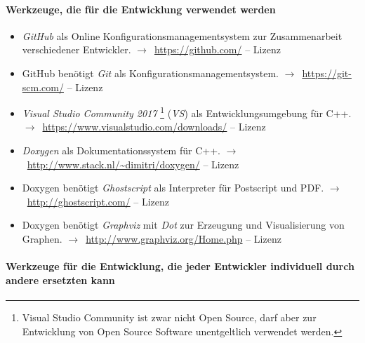 \documentclass[english,ngerman,parskip=half,headsepline,footsepline,
	fleqn,notitlepage]{scrreprt}
\newcounter{Enumi}%
\newcommand*{\tourl}[1]{$\rightarrow$~\url{#1}}
\begin{document}
	\paragraph{Werkzeuge, die für die Entwicklung verwendet werden}

	\begin{itemize}
		\setcounter{enumi}{\value{Enumi}}%

		\item\label{Werkzeug:GitHub}\emph{GitHub}
		als Online Konfigurationsmanagementsystem
		zur Zusammenarbeit verschiedener Entwickler.
		\tourl{https://github.com/}
		-- Lizenz \seename~\cite{bib:GPLii}

		\item\label{Werkzeug:Git}GitHub benötigt
		\emph{Git} als Konfigurationsmanagementsystem.
		\tourl{https://git-scm.com/}
		-- Lizenz \seename~\cite{bib:GPLii}

		\item\label{Werkzeug:VSC}\emph{Visual Studio Community 2017}%
		\footnote{%
			Visual Studio Community ist zwar nicht Open Source,
			darf aber zur Entwicklung von Open Source Software
			unentgeltlich verwendet werden.%
		}
		(\emph{VS}) als Entwicklungsumgebung für C++.
		\tourl{https://www.visualstudio.com/downloads/}
		-- Lizenz \seename~\cite{bib:EULA}

		\item\label{Werkzeug:Doxygen}\emph{Doxygen}
		als Dokumentationssystem für C++.
		\tourl{http://www.stack.nl/~dimitri/doxygen/}
		-- Lizenz \seename~\cite{bib:GPLii}

		\item\label{Werkzeug:Ghostscript}Doxygen benötigt \emph{Ghostscript}
		als Interpreter für Postscript und PDF.
		\tourl{http://ghostscript.com/}
		-- Lizenz \seename~\cite{bib:AGPL}

		\item\label{Werkzeug:Graphviz}Doxygen
		benötigt \emph{Graphviz} mit \emph{Dot}
		zur Erzeugung und Visualisierung von Graphen.
		\tourl{http://www.graphviz.org/Home.php}
		-- Lizenz \seename~\cite{bib:EPL}

		\setcounter{Enumi}{\value{enumi}}%
	\end{itemize}

	\paragraph{Werkzeuge für die Entwicklung,
	die jeder Entwickler individuell durch andere ersetzten kann}
\end{document}
